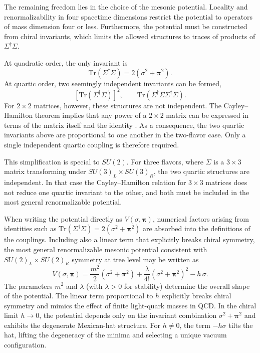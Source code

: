 The remaining freedom lies in the choice of the mesonic potential.
Locality and renormalizability in four spacetime dimensions restrict
the potential to operators of mass dimension four or less.
Furthermore, the potential must be constructed from chiral invariants,
which limits the allowed structures to traces of products of
$\Sigma^\dagger \Sigma$.

At quadratic order, the only invariant is
\begin{equation}
\mathrm{Tr}(\Sigma^\dagger \Sigma)
=
2(\sigma^2 + \boldsymbol{\pi}^2) .
\end{equation}
At quartic order, two seemingly independent invariants can be formed,
\begin{equation}
\left[\mathrm{Tr}(\Sigma^\dagger \Sigma)\right]^2,
\qquad
\mathrm{Tr}(\Sigma^\dagger \Sigma \Sigma^\dagger \Sigma).
\end{equation}
For $2\times2$ matrices, however, these structures are not
independent. The Cayley--Hamilton theorem implies that any power of a
$2\times2$ matrix can be expressed in terms of the matrix itself and
the identity \cite{HornJohnson2012, PeskinSchroeder1995}.
As a consequence, the two quartic invariants above are
proportional to one another in the two-flavor case. Only a single
independent quartic coupling is therefore required.

This simplification is special to $SU(2)$. For three flavors, where
$\Sigma$ is a $3\times3$ matrix transforming under
$SU(3)_L \times SU(3)_R$, the two quartic structures are 
independent. In that case the Cayley--Hamilton relation for $3\times3$
matrices does not reduce one quartic invariant to the other, and both
must be included in the most general renormalizable potential.

When writing the potential directly as $V(\sigma,\boldsymbol{\pi})$,
numerical factors arising from identities such as
$\mathrm{Tr}(\Sigma^\dagger\Sigma)=2(\sigma^2+\boldsymbol{\pi}^2)$ are
absorbed into the definitions of the couplings.
Including also a linear term that explicitly breaks chiral symmetry,
the most general renormalizable mesonic potential consistent with
$SU(2)_L \times SU(2)_R$ symmetry at tree level may be written as
\begin{equation}
V(\sigma,\boldsymbol{\pi}) =
\frac{m^2}{2}(\sigma^2 + \boldsymbol{\pi}^2)
+ \frac{\lambda}{4!}(\sigma^2 + \boldsymbol{\pi}^2)^2
- h\,\sigma .
\label{eq:mesonic_potential}
\end{equation}
The parameters $m^2$ and $\lambda$ (with $\lambda>0$ for stability)
determine the overall shape of the
potential. The linear term proportional to $h$ explicitly breaks
chiral symmetry and mimics the effect of finite light-quark masses in
QCD. In the chiral limit $h \to 0$, the potential depends only on the
invariant combination $\sigma^2 + \boldsymbol{\pi}^2$ and exhibits the
degenerate Mexican-hat structure. For $h \neq 0$, the term $-h\sigma$
tilts the hat, lifting the degeneracy of the minima and selecting a
unique vacuum configuration.

